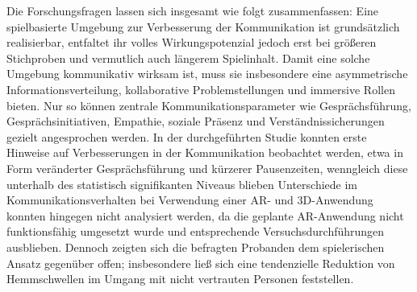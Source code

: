 
Die Forschungsfragen lassen sich insgesamt wie folgt zusammenfassen:
Eine spielbasierte Umgebung zur Verbesserung der Kommunikation ist grundsätzlich realisierbar, entfaltet ihr volles Wirkungspotenzial jedoch erst bei größeren Stichproben und vermutlich auch längerem Spielinhalt. Damit eine solche Umgebung kommunikativ wirksam ist, muss sie insbesondere eine asymmetrische Informationsverteilung, kollaborative Problemstellungen und immersive Rollen bieten. Nur so können zentrale Kommunikationsparameter wie Gesprächsführung, Gesprächsinitiativen, Empathie, soziale Präsenz und Verständnissicherungen gezielt angesprochen werden. In der durchgeführten Studie konnten erste Hinweise auf Verbesserungen in der Kommunikation beobachtet werden, etwa in Form veränderter Gesprächsführung und kürzerer Pausenzeiten, wenngleich diese unterhalb des statistisch signifikanten Niveaus blieben Unterschiede im Kommunikationsverhalten bei Verwendung einer \ac{AR}- und \ac{3D}-Anwendung konnten hingegen nicht analysiert werden, da die geplante AR-Anwendung nicht funktionsfähig umgesetzt wurde und entsprechende Versuchsdurchführungen ausblieben. Dennoch zeigten sich die befragten Probanden dem spielerischen Ansatz gegenüber offen; insbesondere ließ sich eine tendenzielle Reduktion von Hemmschwellen im Umgang mit nicht vertrauten Personen feststellen.